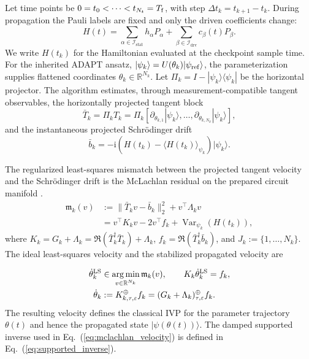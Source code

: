 \documentclass[
  reprint,
  amsmath,
  amssymb,
  aps,
  pra,
  nofootinbib,
  superscriptaddress,
  floatfix
]{revtex4-2}
\newcommand{\placeholder}[1]{\textcolor{red!70!black}{\ifmmode\left[#1\right]\else\textsf{[#1]}\fi}}
\newcommand{\ii}{\mathrm{i}}
\newcommand{\stat}{\mathrm{stat}}
\newcommand{\drv}{\mathrm{drv}}
\newcommand{\Var}{\operatorname{Var}}
\newcommand{\argminp}{\mathop{\mathrm{arg\,min}}}
\newcommand{\eps}{\varepsilon}
\newcommand{\ket}[1]{|#1\rangle}
\newcommand{\bra}[1]{\langle #1|}
\newcommand{\expval}[1]{\langle #1\rangle}
\begin{document}
Let time points be $0=t_0<\cdots<t_{N_t}=T_{\rm f}$, with step $\Delta t_k=t_{k+1}-t_k$. During propagation the Pauli labels are fixed and only the driven coefficients change:
\begin{equation}
H(t)=\sum_{\alpha\in\mathcal I_{\stat}}h_\alpha P_\alpha
+\sum_{\beta\in\mathcal I_{\drv}}c_\beta(t)P_\beta .
\label{eq:dynamics_sampling}
\end{equation}
We write $H(t_k)$ for the Hamiltonian evaluated at the checkpoint sample time.
For the inherited ADAPT ansatz, $\ket{\psi_k}=U(\theta_k)\ket{\psi_{\rm ref}}$, the parameterization supplies flattened coordinates $\theta_k\in\mathbb R^{N_k}$. Let $\Pi_k=I-\ket{\psi_k}\!\bra{\psi_k}$ be the horizontal projector.  The algorithm estimates, through measurement-compatible tangent observables, the horizontally projected tangent block
\begin{equation}
\bar T_k=\Pi_k T_k
=\Pi_k\left[
\partial_{\theta_{k,1}}\ket{\psi_k},\ldots,
\partial_{\theta_{k,N_k}}\ket{\psi_k}
\right],
\label{eq:projected_tangent_block}
\end{equation}
and the instantaneous projected Schrödinger drift
\begin{equation}
\bar b_k=-\ii\left(H(t_k)-\expval{H(t_k)}_{\psi_k}\right)\ket{\psi_k}.
\label{eq:projected_schrodinger_drift}
\end{equation}

The regularized least-squares mismatch between the projected tangent velocity and the Schrödinger drift is the McLachlan residual on the prepared circuit manifold \cite{McLachlan1964,Yuan2019VQS,Barison2021}.
\begin{equation}
\begin{aligned}
\mathfrak m_k(v)
&:=\|\bar T_kv-\bar b_k\|_2^2
+v^\top\Lambda_kv \\
&=v^\top K_kv-2v^\top f_k+\Var_{\psi_k}(H(t_k)),
\end{aligned}
\label{eq:mclachlan_metric_objective}
\end{equation}
where $K_k=G_k+\Lambda_k=\Re(\bar T_k^\dagger\bar T_k)+\Lambda_k$,
$f_k=\Re(\bar T_k^\dagger\bar b_k)$, and $J_k:=\{1,\ldots,N_k\}$.
The ideal least-squares velocity and the stabilized propagated velocity are

\begin{equation}
\begin{aligned}
\dot\theta_k^{\rm LS}
&\in\argminp_{v\in\mathbb R^{N_k}}\mathfrak m_k(v),
\qquad
K_k\dot\theta_k^{\rm LS}=f_k,\\
\dot\theta_k
&:=K_{k,\tau,\eps}^{\oplus}f_k
=(G_k+\Lambda_k)_{\tau,\eps}^{\oplus}f_k .
\end{aligned}
\label{eq:mclachlan_velocity}
\end{equation}
The resulting velocity defines the classical IVP for the parameter trajectory $\theta(t)$ and hence the propagated state $\ket{\psi(\theta(t))}$.  The damped supported inverse used in Eq.~(\ref{eq:mclachlan_velocity}) is defined in Eq.~(\ref{eq:supported_inverse}).
\end{document}
